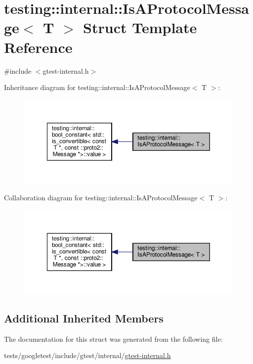 \hypertarget{structtesting_1_1internal_1_1IsAProtocolMessage}{}\section{testing\+:\+:internal\+:\+:Is\+A\+Protocol\+Message$<$ T $>$ Struct Template Reference}
\label{structtesting_1_1internal_1_1IsAProtocolMessage}


{\ttfamily \#include $<$gtest-\/internal.\+h$>$}



Inheritance diagram for testing\+:\+:internal\+:\+:Is\+A\+Protocol\+Message$<$ T $>$\+:\nopagebreak
\begin{figure}[H]
\begin{center}
\leavevmode
\includegraphics[width=350pt]{structtesting_1_1internal_1_1IsAProtocolMessage__inherit__graph}
\end{center}
\end{figure}


Collaboration diagram for testing\+:\+:internal\+:\+:Is\+A\+Protocol\+Message$<$ T $>$\+:\nopagebreak
\begin{figure}[H]
\begin{center}
\leavevmode
\includegraphics[width=350pt]{structtesting_1_1internal_1_1IsAProtocolMessage__coll__graph}
\end{center}
\end{figure}
\subsection*{Additional Inherited Members}


The documentation for this struct was generated from the following file\+:\begin{DoxyCompactItemize}
\item 
tests/googletest/include/gtest/internal/\hyperlink{gtest-internal_8h}{gtest-\/internal.\+h}\end{DoxyCompactItemize}
